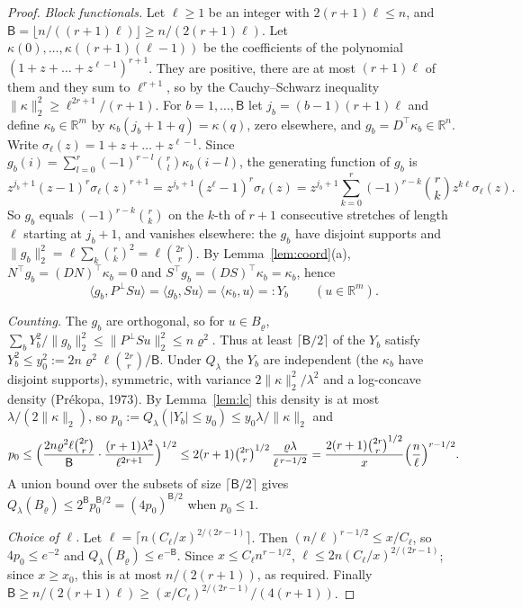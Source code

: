 \documentclass[11pt]{article}
\theoremstyle{definition}
\theoremstyle{remark}
\newcommand{\R}{\mathbb{R}}
\newcommand{\Ql}{Q_\lambda}
\newcommand{\Pp}{P^{\perp}}
\begin{document}
\begin{proof}
\emph{Block functionals.} Let $\ell\ge1$ be an integer with $2(r+1)\ell\le n$, and $\mathsf B=\lfloor n/((r+1)\ell)\rfloor\ge n/(2(r+1)\ell)$. Let $\kappa(0),\dots,\kappa((r+1)(\ell-1))$ be the coefficients of the polynomial $(1+z+\dots+z^{\ell-1})^{r+1}$. They are positive, there are at most $(r+1)\ell$ of them and they sum to $\ell^{r+1}$, so by the Cauchy--Schwarz inequality $\|\kappa\|_2^2\ge\ell^{2r+1}/(r+1)$. For $b=1,\dots,\mathsf B$ let $j_b=(b-1)(r+1)\ell$ and define $\kappa_b\in\R^m$ by $\kappa_b(j_b+1+q)=\kappa(q)$, zero elsewhere, and $g_b=D^\top\kappa_b\in\R^n$. Write $\sigma_\ell(z)=1+z+\dots+z^{\ell-1}$. Since $g_b(i)=\sum_{l=0}^r(-1)^{r-l}\binom rl\kappa_b(i-l)$, the generating function of $g_b$ is
\[
z^{j_b+1}(z-1)^r\sigma_\ell(z)^{r+1}=z^{j_b+1}(z^\ell-1)^r\sigma_\ell(z)=z^{j_b+1}\sum_{k=0}^r(-1)^{r-k}\binom rkz^{k\ell}\sigma_\ell(z).
\]
So $g_b$ equals $(-1)^{r-k}\binom rk$ on the $k$-th of $r+1$ consecutive stretches of length $\ell$ starting at $j_b+1$, and vanishes elsewhere: the $g_b$ have disjoint supports and $\|g_b\|_2^2=\ell\sum_k\binom rk^2=\ell\binom{2r}r$. By Lemma~\ref{lem:coord}(a), $N^\top g_b=(DN)^\top\kappa_b=0$ and $S^\top g_b=(DS)^\top\kappa_b=\kappa_b$, hence
\[
\langle g_b,\Pp Su\rangle=\langle g_b,Su\rangle=\langle\kappa_b,u\rangle=:Y_b\qquad(u\in\R^m).
\]

\emph{Counting.} The $g_b$ are orthogonal, so for $u\in B_\varrho$, $\sum_bY_b^2/\|g_b\|_2^2\le\|\Pp Su\|_2^2\le n\varrho^2$. Thus at least $\lceil\mathsf B/2\rceil$ of the $Y_b$ satisfy $Y_b^2\le y_0^2:=2n\varrho^2\ell\binom{2r}r/\mathsf B$. Under $\Ql$ the $Y_b$ are independent (the $\kappa_b$ have disjoint supports), symmetric, with variance $2\|\kappa\|_2^2/\lambda^2$ and a log-concave density (Pr\'ekopa, 1973). By Lemma~\ref{lem:lc} this density is at most $\lambda/(2\|\kappa\|_2)$, so $p_0:=\Ql(|Y_b|\le y_0)\le y_0\lambda/\|\kappa\|_2$ and
\[
p_0\le\Bigl(\frac{2n\varrho^2\ell\binom{2r}r}{\mathsf B}\cdot\frac{(r+1)\lambda^2}{\ell^{2r+1}}\Bigr)^{1/2}\le2(r+1)\tbinom{2r}r^{1/2}\,\frac{\varrho\lambda}{\ell^{\,r-1/2}}=\frac{2(r+1)\binom{2r}r^{1/2}}{x}\Bigl(\frac n\ell\Bigr)^{r-1/2}.
\]
A union bound over the subsets of size $\lceil\mathsf B/2\rceil$ gives $\Ql(B_\varrho)\le2^{\mathsf B}p_0^{\mathsf B/2}=(4p_0)^{\mathsf B/2}$ when $p_0\le1$.

\emph{Choice of $\ell$.} Let $\ell=\lceil n(C_\ell/x)^{2/(2r-1)}\rceil$. Then $(n/\ell)^{r-1/2}\le x/C_\ell$, so $4p_0\le e^{-2}$ and $\Ql(B_\varrho)\le e^{-\mathsf B}$. Since $x\le C_\ell n^{r-1/2}$, $\ell\le2n(C_\ell/x)^{2/(2r-1)}$; since $x\ge x_0$, this is at most $n/(2(r+1))$, as required. Finally $\mathsf B\ge n/(2(r+1)\ell)\ge(x/C_\ell)^{2/(2r-1)}/(4(r+1))$.
\end{proof}
\end{document}
